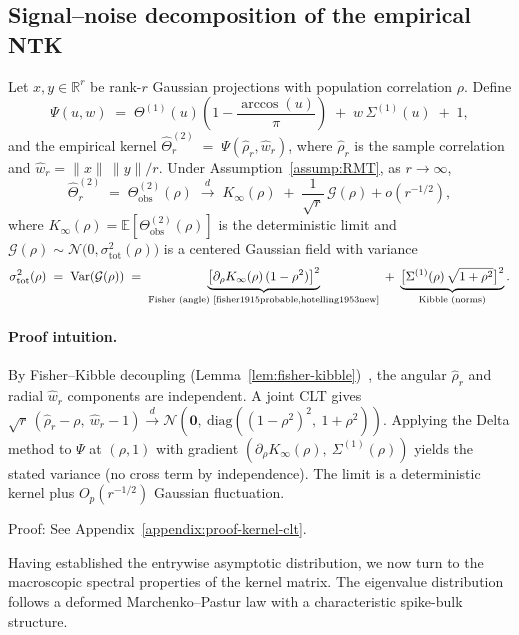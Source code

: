 \subsection{Signal–noise decomposition of the empirical NTK}
\begin{theorem}\label{thm:kernel_clt}
Let \(x, y \in \mathbb{R}^r\) be rank-\(r\) Gaussian projections with population correlation \( \rho \). Define
\[
\Psi(u,w) \;=\; \Theta^{(1)}(u)\!\left(1-\frac{\arccos(u)}{\pi}\right) \;+\; w\,\Sigma^{(1)}(u) \;+\; 1,
\]
and the empirical kernel \( \hat{\Theta}^{(2)}_r \;=\; \Psi(\hat{\rho}_r, \hat{w}_r) \), where \( \hat{\rho}_r \) is the sample correlation and \( \hat{w}_r = \|x\|\,\|y\|/r \). Under Assumption~\ref{assump:RMT}, as \( r\to\infty \),
\[
\hat{\Theta}^{(2)}_r \;=\; \Theta^{(2)}_{\mathrm{obs}}(\rho) \;\xrightarrow{d}\; K_{\infty}(\rho) \;+\; \frac{1}{\sqrt{r}}\,\mathcal{G}(\rho) + o(r^{-1/2}),
\]
where \( K_{\infty}(\rho)=\mathbb{E}[\Theta^{(2)}_{\mathrm{obs}}(\rho)] \) is the deterministic limit and \( \mathcal{G}(\rho) \sim \mathcal{N}\!\big(0,\sigma_{\mathrm{tot}}^2(\rho)\big) \) is a centered Gaussian field with variance
\[
\sigma_{\mathrm{tot}}^2(\rho) \;=\; \mathrm{Var}(\mathcal{G}(\rho)) \;=\; \underbrace{\big[\partial_\rho K_{\infty}(\rho)\,(1-\rho^2)\big]^2}_{\text{Fisher (angle)~\cite{fisher1915probable,hotelling1953new}}} \;+\; \underbrace{\big[\Sigma^{(1)}(\rho)\,\sqrt{1+\rho^2}\big]^2}_{\text{Kibble (norms)}}.
\]
\end{theorem}

\paragraph{Proof intuition.}
By Fisher–Kibble decoupling (Lemma~\ref{lem:fisher-kibble})~\cite{fisher1915probable,hotelling1953new}, the angular \( \hat{\rho}_r \) and radial \( \hat{w}_r \) components are independent. A joint CLT gives \( \sqrt{r}\,(\hat{\rho}_r-\rho,\ \hat{w}_r-1) \xrightarrow{d} \mathcal{N}(\mathbf{0},\ \mathrm{diag}((1-\rho^2)^2,\ 1+\rho^2)) \). Applying the Delta method to \( \Psi \) at \( (\rho,1) \) with gradient \( (\partial_\rho K_{\infty}(\rho),\ \Sigma^{(1)}(\rho)) \) yields the stated variance (no cross term by independence). The limit is a deterministic kernel plus \( O_p(r^{-1/2}) \) Gaussian fluctuation.

Proof: See Appendix~\ref{appendix:proof-kernel-clt}.

Having established the entrywise asymptotic distribution, we now turn to the macroscopic spectral properties of the kernel matrix. The eigenvalue distribution follows a deformed Marchenko–Pastur law with a characteristic spike-bulk structure.

